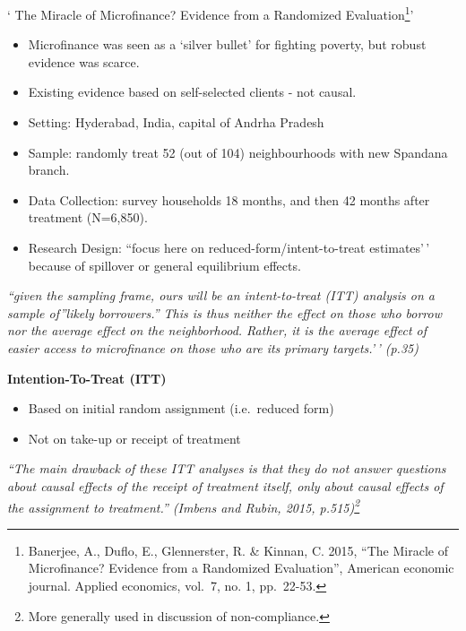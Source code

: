 \documentclass[
  letterpaper,
  DIV=11,
  numbers=noendperiod]{scrreprt}
\providecommand{\tightlist}{%
  \setlength{\itemsep}{0pt}\setlength{\parskip}{0pt}}\usepackage{longtable,booktabs,array}
\theoremstyle{definition}
\theoremstyle{remark}
\begin{document}
`{ The Miracle of Microfinance? Evidence from a Randomized
Evaluation\footnote{Banerjee, A., Duflo, E., Glennerster, R. \& Kinnan,
  C. 2015, ``The Miracle of Microfinance? Evidence from a Randomized
  Evaluation'', American economic journal. Applied economics, vol.~7,
  no. 1, pp.~22-53.}}'

\par

\begin{itemize}
\tightlist
\item
  Microfinance was seen as a `silver bullet' for fighting poverty, but
  robust evidence was scarce.
\item
  Existing evidence based on self-selected clients - not causal.
\item
  {Setting:} Hyderabad, India, capital of Andrha Pradesh
\item
  {Sample:} randomly treat 52 (out of 104) neighbourhoods with new
  Spandana branch.
\item
  {Data Collection:} survey households 18 months, and then 42 months
  after treatment (N=6,850).
\item
  {Research Design:} ``focus here on reduced-form/intent-to-treat
  estimates'\,' because of spillover or general equilibrium effects.
\end{itemize}

\emph{``given the sampling frame, ours will be an intent-to-treat (ITT)
analysis on a sample of''likely borrowers.'' This is thus neither the
effect on those who borrow nor the average effect on the neighborhood.
Rather, it is the average effect of easier access to microfinance on
those who are its primary targets.'\,' (p.35)}

\textbf{Intention-To-Treat (ITT)}

\par

\begin{itemize}
\tightlist
\item
  Based on initial random assignment (i.e.~reduced form)
\item
  Not on take-up or receipt of treatment
\end{itemize}

\emph{``The main drawback of these ITT analyses is that they do not
answer questions about causal effects of the receipt of treatment
itself, only about causal effects of the assignment to treatment.''
(Imbens and Rubin, 2015, p.515)\footnote{More generally used in
  discussion of non-compliance.}}
\end{document}

